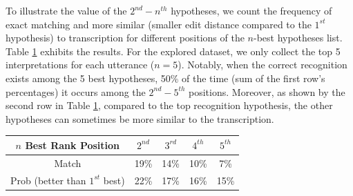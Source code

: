 To illustrate the value of the $2^{nd}- n^{th}$ hypotheses, we count the frequency of exact matching and more similar (smaller edit distance compared to the $1^{st}$ hypothesis) to  transcription for different positions of the $n$-best hypotheses list.
Table \ref{tbl:nbest} exhibits the results. For the explored dataset, we only collect the top 5 interpretations for each utterance ($n = 5$). Notably, when the correct recognition exists among the 5 best hypotheses, 50\% of the time (sum of the first row's percentages) it occurs among the $2^{nd}-5^{th}$ positions. Moreover, as shown by the second row in Table \ref{tbl:nbest}, compared to the top recognition hypothesis, the other hypotheses can sometimes be more similar to the transcription. 



\begin{table}[h]
	\vspace{-1.5ex}
	\label{tbl:nbest}
	\centering
	\begin{tabular}{|c|c c c c|} 
		\hline
		$n$ Best Rank Position & $2^{nd}$ & $3^{rd}$ & $4^{th}$ & $5^{th}$ \\
		\hline
		Match&19\%&14\%&10\%&7\%\\
		Prob (better than $1^{st}$ best) & 22\%&17\%&16\%&15\%\\
		\hline
	\end{tabular}
	\vspace{-2ex}
\end{table}

